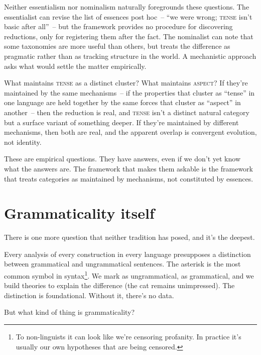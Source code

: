 Neither essentialism nor nominalism naturally foregrounds these questions. The essentialist can revise the list of essences post hoc~-- \enquote{we were wrong; \textsc{tense} isn't basic after all}~-- but the framework provides no procedure for discovering reductions, only for registering them after the fact. The nominalist can note that some taxonomies are more useful than others, but treats the difference as pragmatic rather than as tracking structure in the world. A mechanistic approach asks what would settle the matter empirically.

What maintains \textsc{tense} as a distinct cluster? What maintains \textsc{aspect}? If they're maintained by the same mechanisms~-- if the properties that cluster as \enquote{tense} in one language are held together by the same forces that cluster as \enquote{aspect} in another~-- then the reduction is real, and \textsc{tense} isn't a distinct natural category but a surface variant of something deeper. If they're maintained by different mechanisms, then both are real, and the apparent overlap is convergent evolution, not identity.

These are empirical questions. They have answers, even if we don't yet know what the answers are. The framework that makes them askable is the framework that treats categories as maintained by mechanisms, not constituted by essences.

\section{Grammaticality itself}
\label{sec:3:grammaticality}

There is one more question that neither tradition has posed, and it's the deepest.

Every analysis of every construction in every language presupposes a distinction between grammatical and ungrammatical sentences. The asterisk is the most common symbol in syntax\footnote{To non-linguists it can look like we're censoring profanity. In practice it's usually our own hypotheses that are being censored.}. We mark  as ungrammatical,  as grammatical, and we build theories to explain the difference (the cat remains unimpressed). The distinction is foundational. Without it, there's no data.

But what kind of thing is grammaticality?

